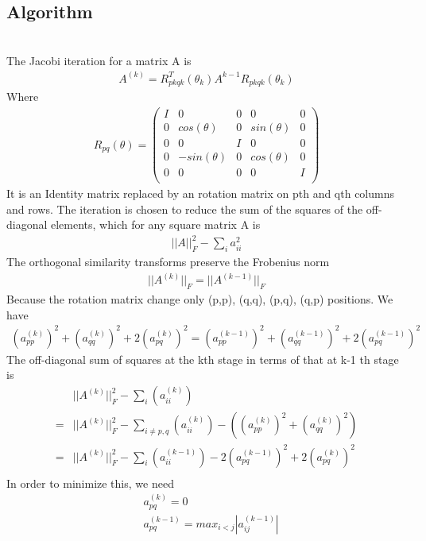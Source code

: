 \documentclass[a4paper]{article}
\begin{document}
\subsection{Algorithm}\\
The Jacobi iteration for a matrix A is
\begin{align*}
	A^{(k)} = R^T_{pkqk}(\theta_k) A^{k-1} R_{pkqk} (\theta_k)
\end{align*}
Where
\begin{align*}
	R_{pq}(\theta)
	= 
	\left( \begin{array}{ccccc}
I      & 	0 	& 	0 	 & 	 0 		& 	0 	\\
0	   & 	cos(\theta) 	& 	0 	 &	 sin(\theta) 		& 	0	\\
0 	   &    0   &   I  	 &   0		&	0	\\
0 	   &    -sin(\theta)   &   0    &   cos(\theta)		& 	0	\\
0      &    0   &   0    & 	 0   	& 	I	\\\end{array} \right)
\end{align*}
It is an Identity matrix replaced by an rotation matrix on pth and qth columns and rows. The iteration is chosen to reduce the sum of the squares of the off-diagonal elements, which for any square matrix A is
\begin{align*}
	||A||_F^2 - \sum_i a_{ii}^2
\end{align*}
The orthogonal similarity transforms preserve the Frobenius norm
\begin{align*}
	|| A^{(k)}||_F = ||A^{(k-1)}||_F
\end{align*}
Because the rotation matrix change only (p,p), (q,q), (p,q), (q,p) positions. We have
\begin{align*}
	(a_{pp}^{(k)})^2 + (a_{qq}^{(k)})^2+ 2 (a_{pq}^{(k)})^2 = (a_{pp}^{(k-1)})^2 + (a_{qq}^{(k-1)})^2 + 2 (a_{pq}^{(k-1)})^2   
\end{align*}
The off-diagonal sum of squares at the kth stage in terms of that at k-1 th stage is
\begin{align*}
	& || A^{(k)}||^2_F - \sum_i (a_{ii}^{(k)}) \\
	= & || A^{(k)}||^2_F - \sum_{i \neq p,q} (a_{ii}^{(k)}) -( (a_{pp}^{(k)})^2 + (a_{qq}^{(k)})^2 ) \\
	= & || A^{(k)}||^2_F - \sum_i (a_{ii}^{(k-1)}) - 2 (a_{pq}^{(k-1)})^2  + 2 (a_{pq}^{(k)})^2  \\
\end{align*}
In order to minimize this, we need
\begin{align*}
	& a_{pq}^{(k)} = 0\\
	& a_{pq}^{(k-1)} = max _{i<j} |a_{ij} ^ {(k-1)}|\\
\end{align*}
\end{document}
